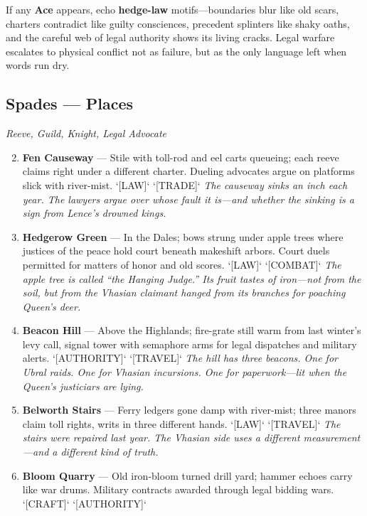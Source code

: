 If any \textbf{Ace} appears, echo \textbf{hedge-law} motifs---boundaries blur like old scars, charters contradict like guilty consciences, precedent splinters like shaky oaths, and the careful web of legal authority shows its living cracks. Legal warfare escalates to physical conflict not as failure, but as the only language left when words run dry.

\subsection{Spades --- Places}
\label{sec:viterra-places}
\noindent\textit{Reeve, Guild, Knight, Legal Advocate}

\begin{enumerate}
\setcounter{enumi}{1}
\item \textbf{Fen Causeway} --- Stile with toll-rod and eel carts queueing; each reeve claims right under a different charter. Dueling advocates argue on platforms slick with river-mist. `[LAW]` `[TRADE]`
  \hfill \textit{The causeway sinks an inch each year. The lawyers argue over whose fault it is---and whether the sinking is a sign from Lence's drowned kings.}
\item \textbf{Hedgerow Green} --- In the Dales; bows strung under apple trees where justices of the peace hold court beneath makeshift arbors. Court duels permitted for matters of honor and old scores. `[LAW]` `[COMBAT]`
  \hfill \textit{The apple tree is called ``the Hanging Judge.'' Its fruit tastes of iron---not from the soil, but from the Vhasian claimant hanged from its branches for poaching Queen's deer.}
\item \textbf{Beacon Hill} --- Above the Highlands; fire-grate still warm from last winter's levy call, signal tower with semaphore arms for legal dispatches and military alerts. `[AUTHORITY]` `[TRAVEL]`
  \hfill \textit{The hill has three beacons. One for Ubral raids. One for Vhasian incursions. One for paperwork---lit when the Queen's justiciars are lying.}
\item \textbf{Belworth Stairs} --- Ferry ledgers gone damp with river-mist; three manors claim toll rights, writs in three different hands. `[LAW]` `[TRAVEL]`
  \hfill \textit{The stairs were repaired last year. The Vhasian side uses a different measurement---and a different kind of truth.}
\item \textbf{Bloom Quarry} --- Old iron-bloom turned drill yard; hammer echoes carry like war drums. Military contracts awarded through legal bidding wars. `[CRAFT]` `[AUTHORITY]`

\end{enumerate}
